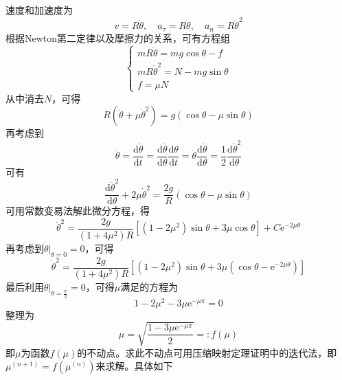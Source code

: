 \begin{solution}
速度和加速度为
\begin{equation*}
	v = R\dot{\theta},\quad a_\tau = R\ddot{\theta},\quad a_n = R\dot{\theta}^2
\end{equation*}
根据Newton第二定律以及摩擦力的关系，可有方程组
\begin{equation*}
	\begin{cases}
		mR\ddot{\theta} = mg\cos \theta - f \\
		mR\dot{\theta}^2 = N-mg\sin \theta \\
		f = \mu N
	\end{cases}
\end{equation*}
从中消去$N$，可得
\begin{equation*}
	R(\ddot{\theta} + \mu\dot{\theta}^2) = g(\cos \theta - \mu\sin \theta)
\end{equation*}
再考虑到
\begin{equation*}
	\ddot{\theta} = \frac{\mathrm{d} \dot{\theta}}{\mathrm{d} t} = \frac{\mathrm{d} \dot{\theta}}{\mathrm{d} \theta} \frac{\mathrm{d} \theta}{\mathrm{d} t} = \dot{\theta} \frac{\mathrm{d} \dot{\theta}}{\mathrm{d} \theta} = \frac12 \frac{\mathrm{d} \dot{\theta}^2}{\mathrm{d} \theta}
\end{equation*}
可有
\begin{equation*}
	\frac{\mathrm{d} \dot{\theta}^2}{\mathrm{d} \theta} + 2\mu\dot{\theta}^2 = \frac{2g}{R}(\cos \theta - \mu\sin \theta)
\end{equation*}
可用常数变易法解此微分方程，得
\begin{equation*}
	\dot{\theta}^2 = \frac{2g}{(1+4\mu^2)R} \left[(1-2\mu^2)\sin \theta + 3\mu \cos \theta\right] + C\mathrm{e}^{-2\mu\theta}
\end{equation*}
再考虑到$\dot{\theta}\big|_{\theta=0} = 0$，可得
\begin{equation*}
	\dot{\theta}^2 = \frac{2g}{(1+4\mu^2)R} \left[(1-2\mu^2)\sin \theta + 3\mu (\cos \theta-\mathrm{e}^{-2\mu\theta})\right]
\end{equation*}
最后利用$\dot{\theta}\big|_{\theta=\frac{\pi}{2}} = 0$，可得$\mu$满足的方程为
\begin{equation*}
	1-2\mu^2-3\mu\mathrm{e}^{-\mu\pi} = 0
\end{equation*}
整理为
\begin{equation*}
	\mu = \sqrt{\frac{1-3\mu\mathrm{e}^{-\mu\pi}}{2}} =: f(\mu)
\end{equation*}
即$\mu$为函数$f(\mu)$的不动点。求此不动点可用压缩映射定理证明中的迭代法，即$\mu^{(n+1)} = f(\mu^{(n)})$来求解。具体如下

\end{solution}
